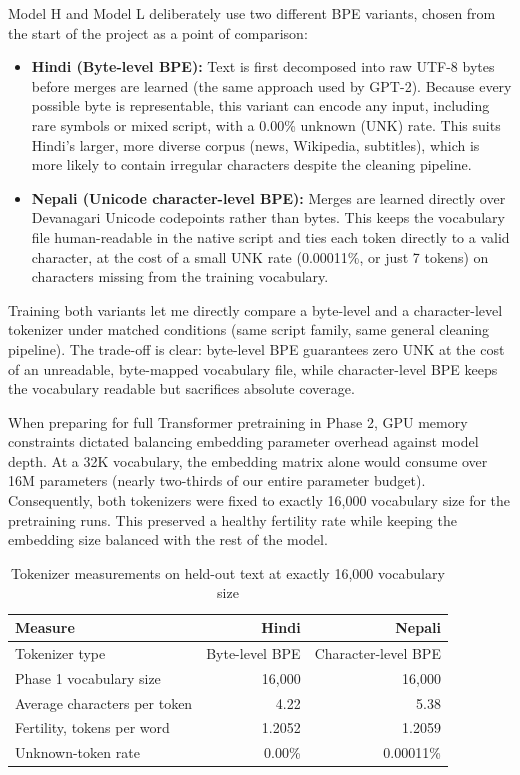 \documentclass[11pt,a4paper]{article}
\begin{document}
Model H and Model L deliberately use two different BPE variants, chosen from the start of the project as a point of comparison:
\begin{itemize}
\item \textbf{Hindi (Byte-level BPE):} Text is first decomposed into raw UTF-8 bytes before merges are learned (the same approach used by GPT-2). Because every possible byte is representable, this variant can encode any input, including rare symbols or mixed script, with a 0.00\% unknown (UNK) rate. This suits Hindi's larger, more diverse corpus (news, Wikipedia, subtitles), which is more likely to contain irregular characters despite the cleaning pipeline.
\item \textbf{Nepali (Unicode character-level BPE):} Merges are learned directly over Devanagari Unicode codepoints rather than bytes. This keeps the vocabulary file human-readable in the native script and ties each token directly to a valid character, at the cost of a small UNK rate (0.00011\%, or just 7 tokens) on characters missing from the training vocabulary.
\end{itemize}
Training both variants let me directly compare a byte-level and a character-level tokenizer under matched conditions (same script family, same general cleaning pipeline). The trade-off is clear: byte-level BPE guarantees zero UNK at the cost of an unreadable, byte-mapped vocabulary file, while character-level BPE keeps the vocabulary readable but sacrifices absolute coverage.

When preparing for full Transformer pretraining in Phase 2, GPU memory constraints dictated balancing embedding parameter overhead against model depth. At a 32K vocabulary, the embedding matrix alone would consume over 16M parameters (nearly two-thirds of our entire parameter budget). Consequently, both tokenizers were fixed to exactly 16,000 vocabulary size for the pretraining runs. This preserved a healthy fertility rate while keeping the embedding size balanced with the rest of the model.

\begin{table}[htbp]
\centering
\caption{Tokenizer measurements on held-out text at exactly 16,000 vocabulary size}
\begin{tabular}{p{5.0cm}rr}
\toprule
\textbf{Measure} & \textbf{Hindi} & \textbf{Nepali} \\
\midrule
Tokenizer type & Byte-level BPE & Character-level BPE \\
Phase 1 vocabulary size & 16,000 & 16,000 \\
Average characters per token & 4.22 & 5.38 \\
Fertility, tokens per word & 1.2052 & 1.2059 \\
Unknown-token rate & 0.00\% & 0.00011\% \\
\bottomrule
\end{tabular}
\end{table}
\end{document}
